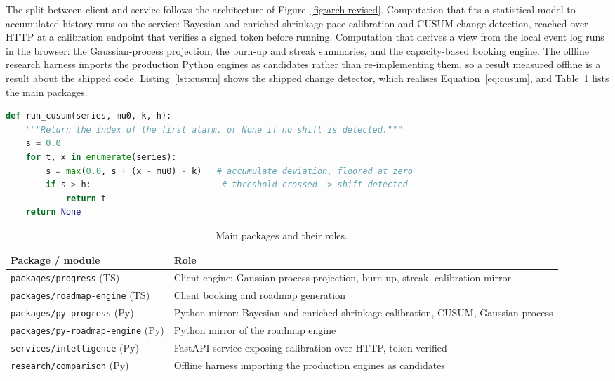The split between client and service follows the architecture of Figure~\ref{fig:arch-revised}. Computation that fits a statistical model to accumulated history runs on the service: Bayesian and enriched-shrinkage pace calibration and CUSUM change detection, reached over HTTP at a calibration endpoint that verifies a signed token before running. Computation that derives a view from the local event log runs in the browser: the Gaussian-process projection, the burn-up and streak summaries, and the capacity-based booking engine. The offline research harness imports the production Python engines as candidates rather than re-implementing them, so a result measured offline is a result about the shipped code. Listing~\ref{lst:cusum} shows the shipped change detector, which realises Equation~\eqref{eq:cusum}, and Table~\ref{tab:packages} lists the main packages.

\noindent\begin{minipage}{\linewidth}
\begin{lstlisting}[language=Python, caption={The shipped one-sided CUSUM detector, realising Equation~\eqref{eq:cusum}.}, label={lst:cusum}]
def run_cusum(series, mu0, k, h):
    """Return the index of the first alarm, or None if no shift is detected."""
    s = 0.0
    for t, x in enumerate(series):
        s = max(0.0, s + (x - mu0) - k)   # accumulate deviation, floored at zero
        if s > h:                          # threshold crossed -> shift detected
            return t
    return None
\end{lstlisting}
\end{minipage}

\begin{table}[H]
\centering
\footnotesize
\caption{Main packages and their roles.}
\label{tab:packages}
\begin{tabular}{p{4.8cm} p{7.6cm}}
\toprule
\textbf{Package / module} & \textbf{Role} \\
\midrule
\texttt{packages/progress} (TS) & Client engine: Gaussian-process projection, burn-up, streak, calibration mirror \\
\texttt{packages/roadmap-engine} (TS) & Client booking and roadmap generation \\
\texttt{packages/py-progress} (Py) & Python mirror: Bayesian and enriched-shrinkage calibration, CUSUM, Gaussian process \\
\texttt{packages/py-roadmap-engine} (Py) & Python mirror of the roadmap engine \\
\texttt{services/intelligence} (Py) & FastAPI service exposing calibration over HTTP, token-verified \\
\texttt{research/comparison} (Py) & Offline harness importing the production engines as candidates \\
\bottomrule
\end{tabular}
\end{table}

